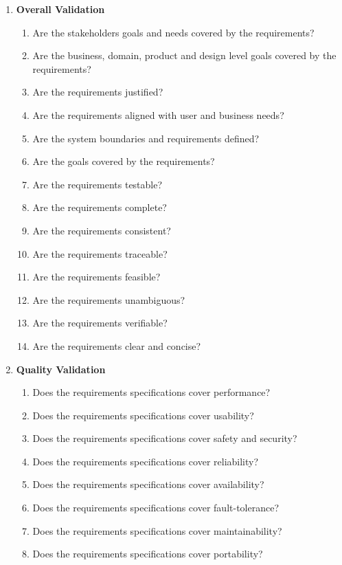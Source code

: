 \begin{enumerate}
    \item \textbf{Overall Validation}
    \begin{enumerate}
        \item Are the stakeholders goals and needs covered by the requirements?
        \item Are the business, domain, product and design level goals covered by the requirements?   
        \item Are the requirements justified?
        \item Are the requirements aligned with user and business needs?
        \item Are the system boundaries and requirements defined?
        \item Are the goals covered by the requirements?
        \item Are the requirements testable?
        \item Are the requirements complete?
        \item Are the requirements consistent?
        \item Are the requirements traceable?
        \item Are the requirements feasible?
        \item Are the requirements unambiguous?
        \item Are the requirements verifiable?
        \item Are the requirements clear and concise?
    \end{enumerate}
    \item \textbf{Quality Validation}
    \begin{enumerate}
        \item Does the requirements specifications cover performance?
        \item Does the requirements specifications cover usability?
        \item Does the requirements specifications cover safety and security?
        \item Does the requirements specifications cover reliability?
        \item Does the requirements specifications cover availability?
        \item Does the requirements specifications cover fault-tolerance?
        \item Does the requirements specifications cover maintainability?
        \item Does the requirements specifications cover portability?

\end{enumerate}
\end{enumerate}
